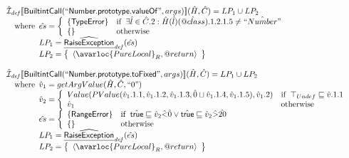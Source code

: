 \[\begin{array}{l}
\aI_{\it def}\lbr \SF{BuiltintCall}(``\SF{Number.prototype.valueOf}",args)\rbr(\hat{H},\hat{C}) = LP_1 \cup LP_2\\
\quad\wherec{
  \hat{es} = \left\{\begin{array}{ll}
      \{ \SF{TypeError} \}
      & \ifc{\exists\hat{l}\in\hat{C}.2: \hat{H}(\hat{l})(\avarprop{class}).1.2.1.5 \neq \hat{``Number"}}\\
      \set{} & \owc
    \end{array}\right.\\
  LP_1 = \ahf{RaiseException}_{\it def}(\hat{es})\\
  LP_2 = \set{\langle\avarloc{PureLocal}_R,\varprop{return}\rangle}\\
  }\\
\\




\aI_{\it def}\lbr \SF{BuiltintCall}(``\SF{Number.prototype.toFixed}",args)\rbr(\hat{H},\hat{C}) = LP_1 \cup LP_2\\
\quad\wherec{
  \hat{v}_1 =getArgValue(\hat{H}, \hat{C}, ``0")\\
  \hat{v}_2 = \left\{\begin{array}{ll}
      Value(PValue(\hat{v}_1.1.1,\hat{v}_1.1.2,\hat{v}_1.1.3,
        \hat{0} \sqcup \hat{v}_1.1.4,\hat{v}_1.1.5), \hat{v}_1.2)
      & \ifc{\top_{Undef} \sqsubseteq \hat{v}.1.1}\\
      \hat{v}_1 & \owc
    \end{array}\right.\\
  \hat{es} = \left\{\begin{array}{ll}
      \{ \SF{RangeError} \}
      & \ifc{\atrue \sqsubseteq \hat{v}_2 \hat{<} \hat{0} \lor \atrue \sqsubseteq \hat{v}_2 \hat{>} \hat{20}}\\
      \set{} & \owc
    \end{array}\right.\\
  LP_1 = \ahf{RaiseException}_{\it def}(\hat{es})\\
  LP_2 = \set{\langle\avarloc{PureLocal}_R,\varprop{return}\rangle}\\
  }\\
\\



\end{array}\]
